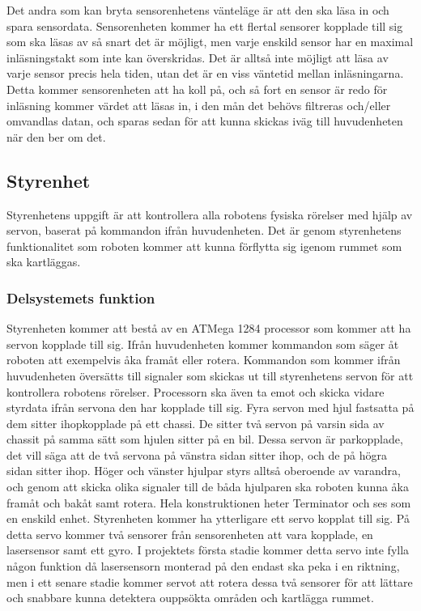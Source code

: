 \documentclass{article}
\begin{document}
\newline\newline
Det andra som kan bryta sensorenhetens vänteläge är att den ska läsa in och spara sensordata. Sensorenheten kommer ha ett flertal sensorer kopplade till sig som ska läsas av så snart det är möjligt, men varje enskild sensor har en maximal inläsningstakt som inte kan överskridas. Det är alltså inte möjligt att läsa av varje sensor precis hela tiden, utan det är en viss väntetid mellan inläsningarna. Detta kommer sensorenheten att ha koll på, och så fort en sensor är redo för inläsning kommer värdet att läsas in, i den mån det behövs filtreras och/eller omvandlas datan, och sparas sedan för att kunna skickas iväg till huvudenheten när den ber om det. 

\clearpage

\subsection{Styrenhet}
Styrenhetens uppgift är att kontrollera alla robotens fysiska rörelser med hjälp av servon, baserat på kommandon ifrån huvudenheten. Det är genom styrenhetens funktionalitet  som roboten kommer att kunna förflytta sig igenom rummet som ska kartläggas.
 
\subsubsection{Delsystemets funktion}
Styrenheten kommer att bestå av en ATMega 1284 processor som kommer att ha servon kopplade till sig. Ifrån huvudenheten kommer kommandon som säger åt roboten att exempelvis åka framåt eller rotera. Kommandon som kommer ifrån huvudenheten översätts till signaler som skickas ut till styrenhetens servon för att kontrollera robotens rörelser. Processorn ska även ta emot och skicka vidare styrdata ifrån servona den har kopplade till sig.
\newline\newline
Fyra servon med hjul fastsatta på dem sitter ihopkopplade på ett chassi. De sitter två servon på varsin sida av chassit på samma sätt som hjulen sitter på en bil. Dessa servon är parkopplade, det vill säga att de två servona på vänstra sidan sitter ihop, och de på högra sidan sitter ihop. Höger och vänster hjulpar styrs alltså oberoende av varandra, och genom att skicka olika signaler till de båda hjulparen ska roboten kunna åka framåt och bakåt samt rotera. Hela konstruktionen heter Terminator och ses som en enskild enhet.
\newline\newline
Styrenheten kommer ha ytterligare ett servo kopplat till sig. På detta servo kommer två sensorer från sensorenheten att vara kopplade, en lasersensor samt ett gyro. I projektets första stadie kommer detta servo inte fylla någon funktion då lasersensorn monterad på den endast ska peka i en riktning, men i ett senare stadie kommer servot att rotera dessa två sensorer för att lättare och snabbare kunna detektera ouppsökta områden och kartlägga rummet.
\end{document}
